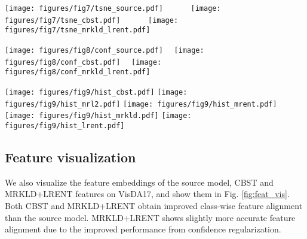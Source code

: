 \documentclass[10pt,twocolumn,letterpaper]{article}
\theoremstyle{plain}
\begin{document}
\begin{figure*}[!t]
	\centering
	\vspace{1mm}
	\texttt{[image: figures/fig7/tsne\_source.pdf]}~~~~~~
	\texttt{[image: figures/fig7/tsne\_cbst.pdf]}~~~~~~
	\texttt{[image: figures/fig7/tsne\_mrkld\_lrent.pdf]}
	\caption{Feature visualization for target domain of VisDA17. From left to right: Source model, CBST, MRKLD+LRENT.}\label{fig:feat_vis}
\end{figure*}

\begin{figure*}[!t]
	\centering
	\texttt{[image: figures/fig8/conf\_source.pdf]}~~
	\texttt{[image: figures/fig8/conf\_cbst.pdf]}~~
	\texttt{[image: figures/fig8/conf\_mrkld\_lrent.pdf]}
	\caption{Confusion matrices with normalization for CBST and CRSTs.}
	\label{confus_mat}
\end{figure*}

\begin{figure*}[!t]
	\centering
	\texttt{[image: figures/fig9/hist\_cbst.pdf]}
	\texttt{[image: figures/fig9/hist\_mrl2.pdf]}
	\texttt{[image: figures/fig9/hist\_mrent.pdf]}
	\texttt{[image: figures/fig9/hist\_mrkld.pdf]}
	\texttt{[image: figures/fig9/hist\_lrent.pdf]}
	\caption{Histograms of softmax probability entries in target domain of GTA5  Cityscapes.}
	\label{fig:softmax_dis}
\end{figure*}

\subsection{Feature visualization}
We also visualize the feature embeddings of the source model, CBST and MRKLD+LRENT features on VisDA17, and show them in Fig. \ref{fig:feat_vis}. Both CBST and MRKLD+LRENT obtain improved class-wise feature alignment than the source model. MRKLD+LRENT shows slightly more accurate feature alignment due to the improved performance from confidence regularization.
\end{document}
